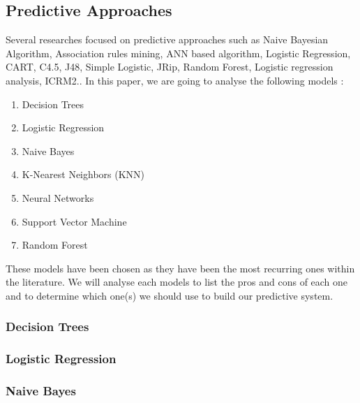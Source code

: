 \documentclass[conference]{IEEEtran}
\begin{document}
\subsection{Predictive Approaches}
\label{subsec:soa_predictiveapproach}
Several researches focused on predictive approaches such as Naive Bayesian Algorithm, Association rules mining, ANN based algorithm, Logistic Regression, CART, C4.5, J48, Simple Logistic, JRip, Random Forest, Logistic regression analysis, ICRM2.\cite{mduma_survey_2019}. 
In this paper, we are going to analyse the following models \cite{mduma_survey_2019}\cite{quinlan_induction_1986,yadav_mining_2012,heredia_student_2015,ramirez_prediction_2018,cox_regression_1958,perez_modelo_2018,pandey_data_2011,hegde_higher_2018,cover_nearest_1967,mardolkar_forecasting_2020,zhang_neural_2000,rudin_stop_2019,siri_predicting_2015,m_alban_she_is_with_the_faculty_of_engineering_and_applied_sciences_of_the_technical_university_cotopaxi_neural_2019,cortes_support-vector_1995,boser_training_1992,cardona_predicting_2019,naicker_linear_2020,lee_machine_2019,behr_early_2020,friedman_stochastic_2002,eckert_analysis_2015,tenpipat_student_2020,liang_machine_2016,liang_big_2016,fischer_angulo_modelo_2012,miranda_analysis_2017,viloria_integration_2019,kemper_predicting_2020}:
\begin{enumerate}
\item Decision Trees
\item Logistic Regression
\item Naive Bayes
\item K-Nearest Neighbors (KNN)
\item Neural Networks
\item Support Vector Machine
\item Random Forest
\end{enumerate}
These models have been chosen as they have been the most recurring ones within the literature. We will analyse each models to list the pros and cons of each one and to determine which one(s) we should use to build our predictive system.

\subsubsection{Decision Trees}
\subsubsection{Logistic Regression}
\subsubsection{Naive Bayes}
\end{document}
